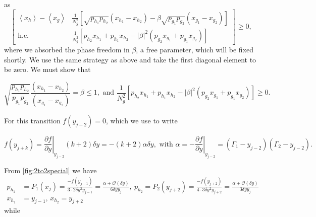 \documentclass{article}
\begin{document}
as
\begin{displaymath}
  \left[\begin{array}{cc}
      \left\langle x_{h}\right\rangle -\left\langle x_{g}\right\rangle & \frac{1}{N_{g}^{2}}\left[\sqrt{p_{h_{1}}p_{h_{2}}}(x_{h_{1}}-x_{h_{2}})-\beta\sqrt{p_{g_{1}}p_{g_{2}}}(x_{g_{1}}-x_{g_{2}})\right]  \\
      \text{h.c.}                                                      & \frac{1}{N_{g}^{2}}\left[p_{h_{2}}x_{h_{1}}+p_{h_{1}}x_{h_{2}}-\left|\beta\right|^{2}(p_{g_{2}}x_{g_{1}}+p_{g_{1}}x_{g_{2}})\right]
    \end{array}\right]\ge0,
\end{displaymath}
where we absorbed the phase freedom in $\beta$, a free parameter,
which will be fixed shortly. We use the same strategy as above and
take the first diagonal element to be zero.
We must show that
\begin{small}
  \begin{displaymath}
    \sqrt{\frac{p_{h_{1}}p_{h_{2}}}{p_{g_{1}}p_{g_{2}}}}\frac{(x_{h_{1}}-x_{h_{2}})}{(x_{g_{1}}-x_{g_{2}})}=\beta\le1,
    \text{ and }
    \frac{1}{N_{g}^{2}}\left[p_{h_{2}}x_{h_{1}}+p_{h_{1}}x_{h_{2}}-\left|\beta\right|^{2}(p_{g_{2}}x_{g_{1}}+p_{g_{1}}x_{g_{2}})\right]\ge0.
  \end{displaymath}
\end{small}For this transition $f(y_{j-2})=0$, which we use to write
\begin{small}
  \begin{displaymath}
    f(y_{j+k})=\left.\frac{\partial f}{\partial y}\right|_{y_{j-2}}(k+2)\delta y=-(k+2)\alpha\delta y, \text{ with }
    \alpha=-\left.\frac{\partial f}{\partial y}\right|_{y_{j-2}}=(\Gamma_{1}-y_{j-2})(\Gamma_{2}-y_{j-2}).
  \end{displaymath}
\end{small}
From  \cref{fig:2to2special} we have
\begin{align*}
  p_{h_{1}} & =P_{1}(x_{j})=\frac{-f(y_{j-1})}{3\cdot 2\delta y^{2}y_{j-1}}=\frac{\alpha+\mathcal{O}(\delta y)}{6\delta yy_{j}},\
  p_{h_{2}}  =P_{2}(y_{j+2})=\frac{-f(y_{j+2})}{4\cdot 3\delta y^{2}y_{j+2}}=\frac{\alpha+\mathcal{O}(\delta y)}{3\delta yy_{j}}  \\
  x_{h_{1}} & =y_{j-1},\,x_{h_{2}}=y_{j+2}
\end{align*}
while
\end{document}
